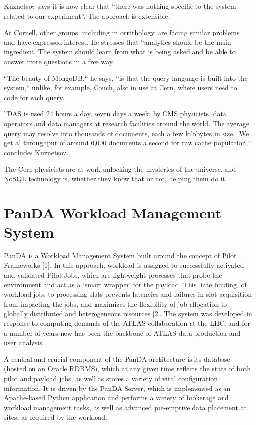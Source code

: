 Kuznetsov says it is now clear that ``there was nothing specific to the system related to our experiment''. The approach is extensible. 

At Cornell, other groups, including in ornithology, are facing similar problems and have expressed interest. He stresses that “analytics should be the main ingredient. The system should learn from what is being asked and be able to answer more questions in a free way.

``The beauty of MongoDB,`` he says, ``is that the query language is built into the system,`` unlike, for example, Couch, also in use at Cern, where users need to code for each query.

''DAS is used 24 hours a day, seven days a week, by CMS physicists, data operators and data managers at research facilities around the world. The average query may resolve into thousands of documents, each a few kilobytes in size. [We get a] throughput of around 6,000 documents a second for raw cache population,`` concludes Kuznetsov.

The Cern physicists are at work unlocking the mysteries of the universe, and NoSQL technology is, whether they know that or not, helping them do it.



\section{PanDA Workload Management System}

PanDA is a Workload Management System built around the concept of Pilot Frameworks [1]. In this approach, workload is assigned to successfully activated and validated Pilot Jobs, which are lightweight processes that probe the environment and act as a ‘smart wrapper’ for the payload. This 'late binding' of workload jobs to processing slots prevents latencies and failures in slot acquisition from impacting the jobs, and maximizes the flexibility of job allocation to globally distributed and heterogeneous resources [2]. The system was developed in response to computing demands of the ATLAS collaboration at the LHC, and for a number of years now has been the backbone of ATLAS data production and user analysis.

A central and crucial component of the PanDA architecture is its database (hosted on an Oracle RDBMS), which at any given time reflects the state of both pilot and payload jobs, as well as stores a variety of vital configuration information. It is driven by the PanDA Server, which is implemented as an Apache-based Python application and performs a variety of brokerage and workload management tasks, as well as advanced pre-emptive data placement at sites, as required by the workload.

